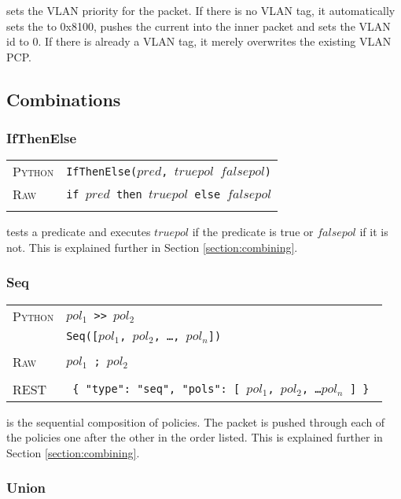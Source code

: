  sets the VLAN priority for the packet.  If there is no VLAN tag, it automatically sets 
the  to 0x8100, pushes the current  into the inner packet and sets the
VLAN id to 0.  If there
is already a VLAN tag, it merely overwrites the existing VLAN PCP.

\subsection{Combinations}

\subsubsection{IfThenElse}

\bigskip
\begin{tabularx}{\linewidth}{lX}
\textsc{Python}   & \texttt{IfThenElse($pred$, $truepol$ $falsepol$)} \\
\textsc{Raw}    & \texttt{if $pred$ then $truepol$ else $falsepol$}  \\ \\
\end{tabularx}

 tests a predicate and executes $truepol$ if the predicate is true or $falsepol$ if it
is not.  This is explained further in Section \ref{section:combining}.


\subsubsection{Seq}

\bigskip
\begin{tabularx}{\linewidth}{lX}
\textsc{Python}   & \texttt{$pol_1$ >> $pol_2$} \\
    & \texttt{Seq([$pol_1$, $pol_2$, \ldots, $pol_n$])} \\ \\
\textsc{Raw}    & \texttt{$pol_1$ ;  $pol_2$}  \\ \\
\textsc{REST} & \texttt{ \{ "type": "seq", "pols": [ $pol_1$, $pol_2$, \ldots $pol_n$ ] \} } 
\end{tabularx}

 is the sequential composition of policies.  The packet is pushed through each of the
policies one after the other in the order listed.  This is explained further in Section \ref{section:combining}.

\subsubsection{Union}

